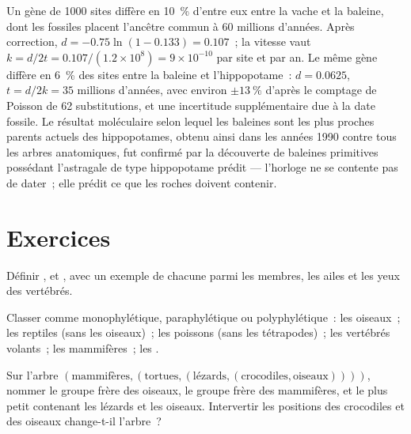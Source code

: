 \begin{example}\label{ex:b2:phylogenetic-trees:dating}
Un gène de \num{1000} sites diffère en \qty{10}{\%} d'entre eux entre la
vache et la baleine, dont les fossiles placent l'ancêtre commun à 60
millions d'années. Après correction, $d = -0.75\ln(1 - 0.133) = 0.107$~; la
vitesse vaut $k
= d/2t = 0.107/(1.2\times 10^{8}) = 9\times 10^{-10}$ par site et par
an. Le même gène diffère en \qty{6}{\%} des sites entre la baleine et
l'hippopotame~:
$d = 0.0625$, $t = d/2k = 35$ millions d'années, avec environ $\pm
\qty{13}{\%}$ d'après le comptage de Poisson de 62 substitutions, et une
incertitude supplémentaire due à la date fossile. Le résultat moléculaire
selon lequel les baleines sont les plus proches parents actuels des
hippopotames, obtenu ainsi dans les années 1990 contre tous les arbres
anatomiques, fut confirmé par la découverte de baleines primitives
possédant l'astragale de type hippopotame prédit --- l'horloge ne se
contente pas de dater~; elle prédit ce que les roches doivent contenir.
\end{example}

\section{Exercices}

\begin{exercise}[$\star$]\label{exo:b2:phylogenetic-trees:1}
Définir ,  et , avec un exemple de chacune
parmi les membres, les ailes et les yeux des vertébrés.
\end{exercise}

\begin{exercise}[$\star$]\label{exo:b2:phylogenetic-trees:2}
Classer comme monophylétique, paraphylétique ou polyphylétique~: les
oiseaux~; les reptiles (sans les oiseaux)~; les poissons (sans les
tétrapodes)~; les vertébrés volants~; les mammifères~; les .
\end{exercise}

\begin{exercise}[$\star$]\label{exo:b2:phylogenetic-trees:3}
Sur l'arbre $(\text{mammifères},(\text{tortues},(\text{lézards},
(\text{crocodiles},\text{oiseaux}))))$, nommer le groupe frère des
oiseaux, le groupe frère des mammifères, et le plus petit 
contenant les lézards et les oiseaux. Intervertir les positions des
crocodiles et des oiseaux change-t-il l'arbre~?
\end{exercise}

